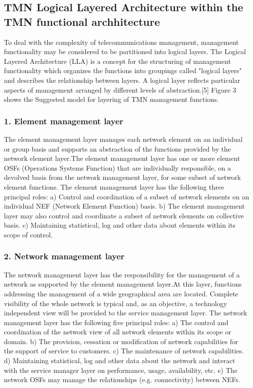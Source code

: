 \documentclass{article}
\begin{document}
\subsection{TMN Logical Layered Architecture within the TMN functional archhitecture}

To deal with the complexity of telecommunications management, management functionality may be considered to be partitioned into logical layers. The Logical Layered Architecture (LLA) is a concept for the structuring of management functionality which organizes the functions into groupings called "logical layers" and describes the relationship between layers. A logical layer reflects particular aspects of management arranged by different levels of abstraction.[5] Figure 3 shows the Suggested model for layering of TMN management functions.
\subsubsection{1. Element management layer}

The element management layer manages each network element on an individual or group basis and supports an abstraction of the functions provided by the network element layer.The element management layer has one or more element OSFs (Operations Systems Function) that are individually responsible, on a devolved basis from the network management layer, for some subset of network element functions. The element management layer has the following three principal roles:
a) Control and coordination of a subset of network elements on an individual NEF (Network Element Function) basis.
b) The element management layer may also control and coordinate a subset of network elements on collective basis.
c) Maintaining statistical, log and other data about elements within its scope of control.

\subsubsection{2. Network management layer}

The network management layer has the responsibility for the management of a network as supported by the element management layer.At this layer, functions addressing the management of a wide geographical area are located. Complete visibility of the whole network is typical and, as an objective, a technology independent view will be provided to the service management layer.
The network management layer has the following five principal roles:
a) The control and coordination of the network view of all network elements within its scope or domain.
b) The provision, cessation or modification of network capabilities for the support of service to customers.
c) The maintenance of network capabilities.
d) Maintaining statistical, log and other data about the network and interact with the service manager layer on performance, usage, availability, etc.
e) The network OSFs may manage the relationships (e.g. connectivity) between NEFs.
\end{document}
